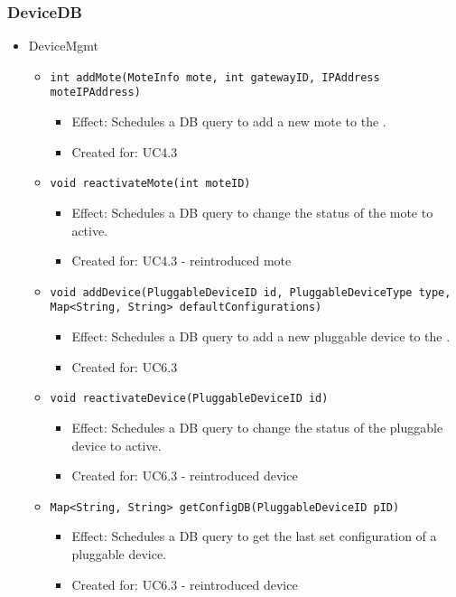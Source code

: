 {{{    \subsubsection{DeviceDB}
        \begin{itemize}
            \item DeviceMgmt
                \begin{itemize}
                    \item \texttt{int addMote(MoteInfo mote, int gatewayID, IPAddress moteIPAddress)}
                        \begin{itemize}
                            \item Effect: Schedules a DB query to add a new mote to the .
                            \item Created for: UC4.3
                        \end{itemize}
                    \item \texttt{void reactivateMote(int moteID)}
                        \begin{itemize}
                            \item Effect: Schedules a DB query to change the status of the mote to active.
                            \item Created for: UC4.3 - reintroduced mote
                        \end{itemize}
                    \item \texttt{void addDevice(PluggableDeviceID id, PluggableDeviceType type, Map<String, String> defaultConfigurations)}
                        \begin{itemize}
                            \item Effect: Schedules a DB query to add a new pluggable device to the .
                            \item Created for: UC6.3
                        \end{itemize}
                    \item \texttt{void reactivateDevice(PluggableDeviceID id)}
                        \begin{itemize}
                            \item Effect: Schedules a DB query to change the status of the pluggable device to active.
                            \item Created for: UC6.3 - reintroduced device
                        \end{itemize}
                    \item \texttt{Map<String, String> getConfigDB(PluggableDeviceID pID)}
                        \begin{itemize}
                            \item Effect: Schedules a DB query to get the last set configuration of a pluggable device.
                            \item Created for: UC6.3 - reintroduced device
                        \end{itemize}
                \end{itemize}


\end{itemize}}}}

